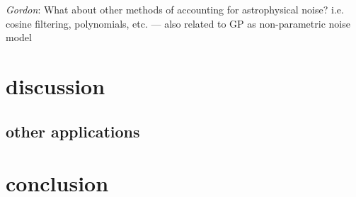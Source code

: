 \documentclass[modern]{aastex62}
\newcommand{\todo}[3]{{\color{#2}\emph{#1}: #3}}
\newcommand{\gordontodo}[1]{\todo{Gordon}{red}{#1}}
\begin{document}
	\gordontodo{What about other methods of accounting for astrophysical noise? i.e. cosine filtering, polynomials, etc. --- also related to GP as non-parametric 
	noise model}

\section{discussion}
	\subsection{other applications}

\section{conclusion}

\acknowledgments

%





\end{document}
